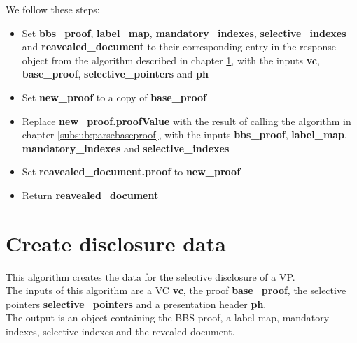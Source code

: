 \documentclass[
	a4paper               %
	,bibliography=totoc   %
	,listof=totoc         %
	,monolingual
]{bfhthesis}              %
\begin{document}
We follow these steps:
\begin{itemize}
	\item Set \textbf{bbs\_proof}, \textbf{label\_map}, \textbf{mandatory\_indexes}, \textbf{selective\_indexes} and \textbf{reavealed\_document} to their corresponding entry in the response object from the algorithm described in chapter \ref*{subsub:createdisclosuredata}, with the inputs \textbf{vc}, \textbf{base\_proof}, \textbf{selective\_pointers} and \textbf{ph}
	\item Set \textbf{new\_proof} to a copy of \textbf{base\_proof}
	\item Replace \textbf{new\_proof.proofValue} with the result of calling the algorithm in chapter \ref{subsub:parsebaseproof}, with the inputs \textbf{bbs\_proof}, \textbf{label\_map}, \textbf{mandatory\_indexes} and \textbf{selective\_indexes}
	\item Set \textbf{reavealed\_document.proof} to \textbf{new\_proof}
	\item Return \textbf{reavealed\_document}
\end{itemize}

\section{Create disclosure data}
\label{subsub:createdisclosuredata}

This algorithm creates the data for the selective disclosure of a VP.\\

The inputs of this algorithm are a VC \textbf{vc}, the proof \textbf{base\_proof}, the selective pointers \textbf{selective\_pointers} and a presentation header \textbf{ph}.\\

The output is an object containing the BBS proof, a label map, mandatory indexes, selective indexes and the revealed document.\\
\end{document}
